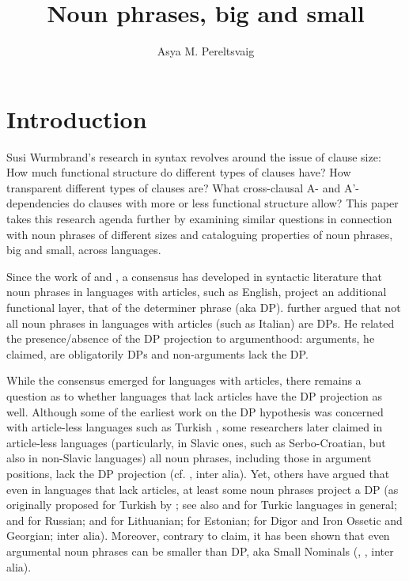 \documentclass[output=paper]{langsci/langscibook}
\author{Asya M. Pereltsvaig\affiliation{}}
\title{Noun phrases, big and small}
\begin{document}
\maketitle 


\section{Introduction}

Susi Wurmbrand’s research in syntax revolves around the issue of clause size: 
How much functional structure do different types of clauses have? 
How transparent different types of clauses are? 
What cross-clausal A- and A'-dependencies do clauses with more or less functional structure allow? 
This paper takes this research agenda further by examining similar questions in connection with noun phrases of different sizes 
and cataloguing properties of noun phrases, big and small, across languages.

Since the work of \citet{Szabolcsi1983} and \citet{abney1987}, a consensus has developed in syntactic literature 
that noun phrases in languages with articles, such as English, project an additional functional layer, that of the determiner phrase (aka DP). 
\citet{Longobardi1994} further argued that not all noun phrases in languages with articles (such as Italian) are DPs. 
He related the presence/absence of the DP projection to argumenthood: arguments, he claimed, are obligatorily DPs and non-arguments lack the DP. 

While the consensus emerged for languages with articles, there remains a question as to whether languages that lack articles have the DP projection as well. 
Although some of the earliest work on the DP hypothesis was concerned with article-less languages such as Turkish \citep{Kornfilt1984}, 
some researchers later claimed in article-less languages (particularly, in Slavic ones, such as Serbo-Cro\-a\-tian, but also in non-Slavic languages) all noun phrases, 
including those in argument positions, lack the DP projection (cf. \citealt{boskovic2008,Boskovic2009,boskovic2012,BoskovicSener2014,Despic2011}, inter alia). 
Yet, others have argued that even in languages that lack articles, at least some noun phrases project a DP (as originally proposed for Turkish by \citealt{Kornfilt1984}; 
see also \citealt{LyutikovaPereltsvaig2015} and \citealt{Kornfilt2018b,Kornfilt2018a} for Turkic languages in general; 
\citealt{Progovac1998} and \citealt{Pereltsvaig2001,Pereltsvaig2006,Pereltsvaig2007} for Russian; 
\citealt{VanHofwegen2013} and \citealt{GillonArmoskaite2015} for Lithuanian; 
\citealt{Norris2018} for Estonian; 
\citealt{Erschler2019b,Erschler2019a} for Digor and Iron Ossetic and Georgian; 
inter alia). 
Moreover, contrary to  claim, it has been shown that even argumental noun phrases can be smaller than DP, 
aka Small Nominals (\citealt{Pereltsvaig2006}, \citealt{KaganPereltsvaig2011}, inter alia). 
\end{document}
